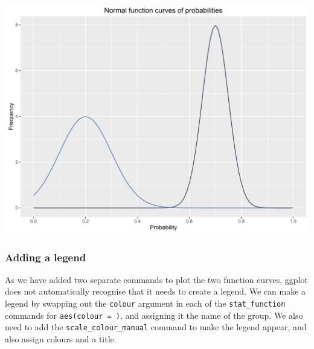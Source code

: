 \documentclass[]{article}
\begin{document}
\begin{center}\includegraphics{0_all_posts_pdf/function_9-1} \end{center}

\subsubsection{Adding a legend}\label{adding-a-legend}

As we have added two separate commands to plot the two function curves,
ggplot does not automatically recognise that it needs to create a
legend. We can make a legend by swapping out the \texttt{colour}
argument in each of the \texttt{stat\_function} commands for
\texttt{aes(colour\ =\ )}, and assigning it the name of the group. We
also need to add the \texttt{scale\_colour\_manual} command to make the
legend appear, and also assign colours and a title.
\end{document}
